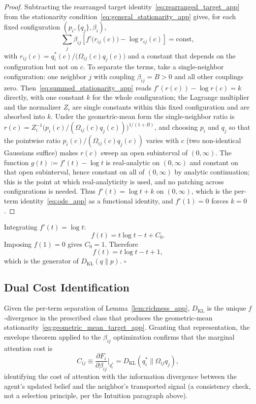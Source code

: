 \documentclass[11pt]{article}
\begin{document}
\begin{proof}
Subtracting the rearranged target identity~\eqref{eq:rearranged_target_app} from the stationarity condition~\eqref{eq:general_stationarity_app} gives, for each fixed configuration $(p_i, \{q_j\}, \beta_i)$,
\begin{equation}
\sum_j \beta_{ij}\left[f'\big(r_{ij}(c)\big) - \log r_{ij}(c)\right] = \text{const},
\label{eq:summed_stationarity_app}
\end{equation}
with $r_{ij}(c) = q_i^*(c)/\big(\Omega_{ij}(c)q_j(c)\big)$ and a constant that depends on the configuration but not on $c$. To separate the terms, take a single-neighbor configuration: one neighbor $j$ with coupling $\beta_{ij} = B > 0$ and all other couplings zero. Then~\eqref{eq:summed_stationarity_app} reads $f'(r(c)) - \log r(c) = k$ directly, with one constant $k$ for the whole configuration; the Lagrange multiplier and the normalizer $Z_i$ are single constants within this fixed configuration and are absorbed into $k$. Under the geometric-mean form the single-neighbor ratio is $r(c) = Z_i^{-1}\big(p_i(c)/(\Omega_{ij}(c)q_j(c))\big)^{1/(1+B)}$, and choosing $p_i$ and $q_j$ so that the pointwise ratio $p_i(c)/(\Omega_{ij}(c)q_j(c))$ varies with $c$ (two non-identical Gaussians suffice) makes $r(c)$ sweep an open subinterval of $(0, \infty)$. The function $g(t) := f'(t) - \log t$ is real-analytic on $(0, \infty)$ and constant on that open subinterval, hence constant on all of $(0, \infty)$ by analytic continuation; this is the point at which real-analyticity is used, and no patching across configurations is needed. Thus $f'(t) = \log t + k$ on $(0, \infty)$, which is the per-term identity~\eqref{eq:ode_app} as a functional identity, and $f'(1) = 0$ forces $k = 0$.
\end{proof}

Integrating $f'(t) = \log t$:
\[
f(t) = t\log t - t + C_0.
\]
Imposing $f(1)=0$ gives $C_0 = 1$. Therefore
\[
f(t) = t\log t - t + 1,
\]
which is the generator of $D_{\mathrm{KL}}(q\|p)$. \hfill $\square$

\subsection*{Dual Cost Identification}
Given the per-term separation of Lemma~\ref{lem:richness_app}, $D_{\mathrm{KL}}$ is the unique $f$-divergence in the prescribed class that produces the geometric-mean stationarity~\eqref{eq:geometric_mean_target_app}. Granting that representation, the envelope theorem applied to the $\beta_{ij}$ optimization confirms that the marginal attention cost is
\begin{equation}
C_{ij} \equiv \frac{\partial F_i}{\partial\beta_{ij}}\bigg|_{q_i^*}
= D_{\mathrm{KL}}(q_i^*\|\Omega_{ij}q_j),
\end{equation}
identifying the cost of attention with the information divergence between the agent's updated belief and the neighbor's transported signal (a consistency check, not a selection principle, per the Intuition paragraph above).
\end{document}
